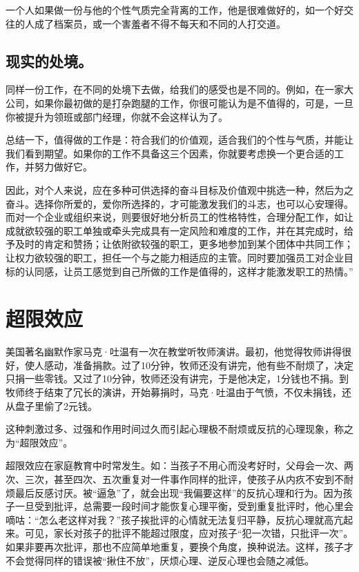 \documentclass[11pt]{ctexart}
\begin{document}
一个人如果做一份与他的个性气质完全背离的工作，他是很难做好的，如一个好交往的人成了档案员，或一个害羞者不得不每天和不同的人打交道。
\subsection{现实的处境。}
\label{sec-17-3}


同样一份工作，在不同的处境下去做，给我们的感受也是不同的。例如，在一家大公司，如果你最初做的是打杂跑腿的工作，你很可能认为是不值得的，可是，一旦你被提升为领班或部门经理，你就不会这样认为了。

总结一下，值得做的工作是：符合我们的价值观，适合我们的个性与气质，并能让我们看到期望。如果你的工作不具备这三个因素，你就要考虑换一个更合适的工作，并努力做好它。

因此，对个人来说，应在多种可供选择的奋斗目标及价值观中挑选一种，然后为之奋斗。选择你所爱的，爱你所选择的，才可能激发我们的斗志，也可以心安理得。而对一个企业或组织来说，则要很好地分析员工的性格特性，合理分配工作，如让成就欲较强的职工单独或牵头完成具有一定风险和难度的工作，并在其完成时，给予及时的肯定和赞扬；让依附欲较强的职工，更多地参加到某个团体中共同工作；让权力欲较强的职工，担任一个与之能力相适应的主管。同时要加强员工对企业目标的认同感，让员工感觉到自己所做的工作是值得的，这样才能激发职工的热情。”
\section{超限效应}
\label{sec-18}


美国著名幽默作家马克·吐温有一次在教堂听牧师演讲。最初，他觉得牧师讲得很好，使人感动，准备捐款。过了10分钟，牧师还没有讲完，他有些不耐烦了，决定只捐一些零钱。又过了10分钟，牧师还没有讲完，于是他决定，1分钱也不捐。到牧师终于结束了冗长的演讲，开始募捐时，马克·吐温由于气愤，不仅未捐钱，还从盘子里偷了2元钱。

这种刺激过多、过强和作用时间过久而引起心理极不耐烦或反抗的心理现象，称之为“超限效应”。

超限效应在家庭教育中时常发生。如：当孩子不用心而没考好时，父母会一次、两次、三次，甚至四次、五次重复对一件事作同样的批评，使孩子从内疚不安到不耐烦最后反感讨厌。被“逼急”了，就会出现“我偏要这样”的反抗心理和行为。因为孩子一旦受到批评，总需要一段时间才能恢复心理平衡，受到重复批评时，他心里会嘀咕：“怎么老这样对我？”孩子挨批评的心情就无法复归平静，反抗心理就高亢起来。可见，家长对孩子的批评不能超过限度，应对孩子“犯一次错，只批评一次”。如果非要再次批评，那也不应简单地重复，要换个角度，换种说法。这样，孩子才不会觉得同样的错误被“揪住不放”，厌烦心理、逆反心理也会随之减低。
\end{document}
